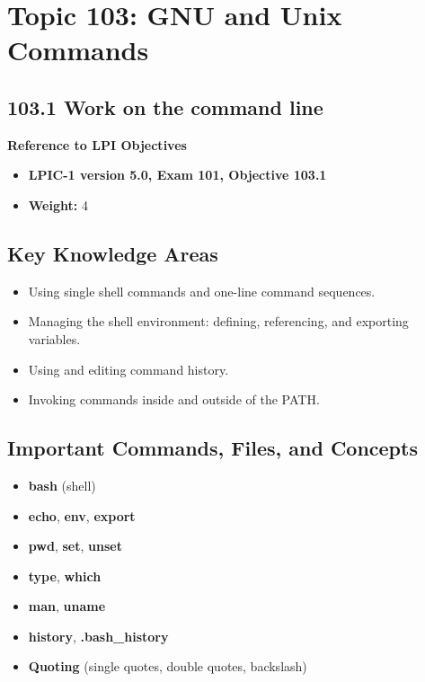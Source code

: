 \documentclass[a4paper]{report}
\begin{document}
\newpage
\chapter{Topic 103: GNU and Unix Commands}

\newpage
\section*{103.1 Work on the command line}


\textbf{Reference to LPI Objectives}
\begin{itemize}
    \item \textbf{LPIC-1 version 5.0, Exam 101, Objective 103.1}
    \item \textbf{Weight:} 4
\end{itemize}

\section*{Key Knowledge Areas}
\begin{itemize}
    \item Using single shell commands and one-line command sequences.
    \item Managing the shell environment: defining, referencing, and exporting variables.
    \item Using and editing command history.
    \item Invoking commands inside and outside of the PATH.
\end{itemize}

\section*{Important Commands, Files, and Concepts}
\begin{itemize}
    \item \textbf{bash} (shell)
    \item \textbf{echo}, \textbf{env}, \textbf{export}
    \item \textbf{pwd}, \textbf{set}, \textbf{unset}
    \item \textbf{type}, \textbf{which}
    \item \textbf{man}, \textbf{uname}
    \item \textbf{history}, \textbf{.bash\_history}
    \item \textbf{Quoting} (single quotes, double quotes, backslash)
\end{itemize}
\end{document}
